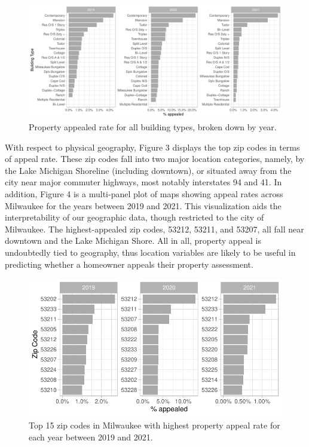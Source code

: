 \documentclass[
  12pt,
]{article}
\begin{document}
\begin{figure}[H]

{\centering \includegraphics{unnamed-chunk-4-1} 

}

\caption{Property appealed rate for all building types, broken down by year.}\label{fig:unnamed-chunk-4}
\end{figure}

With respect to physical geography, Figure 3 displays the top zip codes
in terms of appeal rate. These zip codes fall into two major location
categories, namely, by the Lake Michigan Shoreline (including downtown),
or situated away from the city near major commuter highways, most
notably interstates 94 and 41. In addition, Figure 4 is a multi-panel
plot of maps showing appeal rates across Milwaukee for the years between
2019 and 2021. This visualization aids the interpretability of our
geographic data, though restricted to the city of Milwaukee. The highest-appealed zip codes, 53212, 53211, and 53207, all fall near
downtown and the Lake Michigan Shore. All in all, property appeal is
undoubtedly tied to geography, thus location variables are likely to be
useful in predicting whether a homeowner appeals their property
assessment.

\begin{figure}[H]

{\centering \includegraphics{unnamed-chunk-5-1} 

}

\caption{Top 15 zip codes in Milwaukee with highest property appeal rate for each year between 2019 and 2021.}\label{fig:unnamed-chunk-5}
\end{figure}
\end{document}
